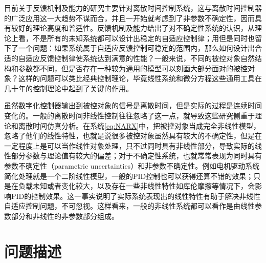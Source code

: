 目前关于反馈机制及能力的研究主要针对离散时间控制系统，这与离散时间控制器的广泛应用这一大趋势不谋而合，并且一开始就考虑到了非参数不确定性，因而具有较好的理论高度和普适性。反馈机制及能力给出了对不确定性系统的认识，从理论上看，不是所有的未知系统都可以设计出稳定的自适应控制律；用但是同时也留下了一个问题：如果系统属于自适应反馈控制可稳定的范围内，那么如何设计出合适的自适应反馈控制律使系统达到满意的性能？一般来说，不同的被控对象自然结构和参数都不同，但是否存在一种较为通用的模型可以刻画大部分面对的被控对象？这样的问题可以类比经典控制理论，毕竟线性系统和微分方程这些通用工具在几十年的控制理论中起到了关键的作用。

虽然数字化控制器输出到被控对象的信号是离散时间，但是实际的过程是连续时间变化的。一般的离散时间非线性控制往往忽略了这一点，就导致这些研究侧重于理论和离散时间仿真分析。在系统\eqref{eq:NARX}中，把被控对象当成完全非线性模型，忽略了他们的线性特性，也就是说很多被控对象虽然具有较大的不确定性，但是在一定程度上是可以当作线性对象处理，只不过同时具有非线性部分，导致实际的线性部分参数与理论值有较大的偏差；对于不确定性系统，也就常常表现为同时具有参数不确定性（parametric uncertainties）和非参数不确定性。例如电机驱动系统简化处理就是一个二阶线性模型，一般的PID控制也可以获得还算不错的效果；只是在负载未知或者变化较大，以及存在一些非线性特性如库伦摩擦等情况下，会影响PID的控制效果。这一事实说明了实际系统表现出的线性特性有助于解决非线性自适应控制问题，不可忽视。这样看来，一般的非线性系统都可以看作是由线性参数部分和非线性的非参数部分组成。

\section{问题描述}